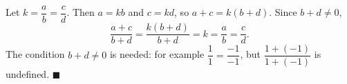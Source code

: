 Let $k=\dfrac {a}{b}=\dfrac {c}{d}$. Then $a=kb$ and $c=kd$, so $a+c=k(b+d)$. Since $b+d\ne0$,
\[
\dfrac{a+c}{b+d}=\dfrac{k(b+d)}{b+d}=k=\dfrac {a}{b}=\dfrac {c}{d} .
\]
The condition $b+d\ne0$ is needed: for example $\dfrac{1}{1}=\dfrac{-1}{-1}$, but $\dfrac{1+(-1)}{1+(-1)}$ is undefined. $\blacksquare$

